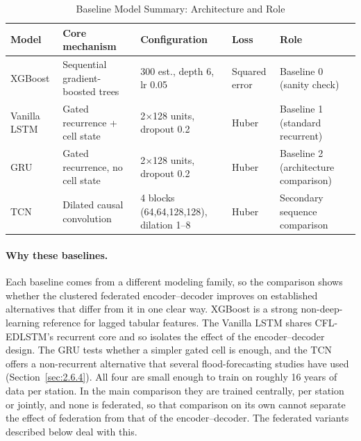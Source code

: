 \begin{table}[htbp]
  \centering
  \caption{Baseline Model Summary: Architecture and Role}
  \label{tab:3.6}
  \small
  \begin{tabularx}{\linewidth}{@{}L{2.4cm} L{3.4cm} L{3.4cm} L{1.6cm} X@{}}
    \toprule
    \textbf{Model} & \textbf{Core mechanism} & \textbf{Configuration} & \textbf{Loss} & \textbf{Role} \\
    \midrule
    XGBoost & Sequential gradient-boosted trees & 300 est., depth 6, lr 0.05 & Squared error & Baseline 0 (sanity check) \\
    Vanilla LSTM & Gated recurrence + cell state & 2$\times$128 units, dropout 0.2 & Huber & Baseline 1 (standard recurrent) \\
    GRU & Gated recurrence, no cell state & 2$\times$128 units, dropout 0.2 & Huber & Baseline 2 (architecture comparison) \\
    TCN & Dilated causal convolution & 4 blocks (64,64,128,128), dilation 1--8 & Huber & Secondary sequence comparison \\
    \bottomrule
  \end{tabularx}
\end{table}

\paragraph{Why these baselines.}
\label{sec:baseline_rationale}
Each baseline comes from a different modeling family, so the comparison shows
whether the clustered federated encoder--decoder improves on established
alternatives that differ from it in one clear way. XGBoost is a strong
non-deep-learning reference for lagged tabular features. The Vanilla LSTM shares
CFL-EDLSTM's recurrent core and so isolates the effect of the encoder--decoder
design. The GRU tests whether a simpler gated cell is enough, and the TCN offers
a non-recurrent alternative that several flood-forecasting studies have used
(Section~\ref{sec:2.6.4}). All four are small enough to train on roughly 16
years of data per station. In the main comparison they are trained centrally,
per station or jointly, and none is federated, so that comparison on its own
cannot separate the effect of federation from that of the encoder--decoder. The
federated variants described below deal with this.

